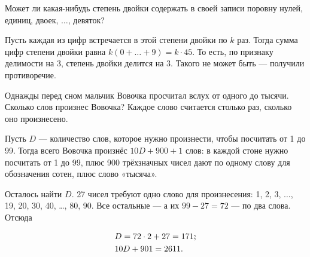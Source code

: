 \begin{itemize}

\itA Может ли какая-нибудь степень двойки содержать в своей записи поровну нулей, единиц, двоек, $\ldots$, девяток?

\itr Пусть каждая из цифр встречается в этой степени двойки по $k$ раз. Тогда сумма цифр степени двойки равна $k(0 + \ldots + 9) = k \cdot 45$. То есть, по признаку делимости на 3, степень двойки делится на 3. Такого не может быть — получили противоречие.

\itB Однажды перед сном мальчик Вовочка просчитал вслух от одного до тысячи. Сколько слов произнес Вовочка? Каждое слово считается столько раз, сколько оно произнесено.

\itr Пусть $D$ — количество слов, которое нужно произнести, чтобы посчитать от 1 до 99. Тогда всего Вовочка произнёс $10D + 900 + 1$ слов: в каждой стоне нужно посчитать от 1 до 99, плюс 900 трёхзначных чисел дают по одному слову для обозначения сотен, плюс слово «тысяча».

Осталось найти $D$. 27 чисел требуют одно слово для произнесения: 1, 2, 3, $\ldots$, 19, 20, 30, 40, \ldots, 80, 90. Все остальные — а их $99 - 27 = 72$ — по два слова. Отсюда

\begin{align*}
	& D = 72 \cdot 2 + 27 = 171\scolon \\
	& 10D + 901 = 2611.
\end{align*}

\end{itemize}